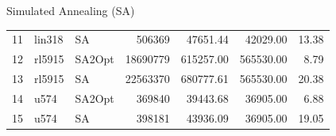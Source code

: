 \documentclass{beamer}
\begin{document}
\begin{frame}{Simulated Annealing (SA)}
\begin{table}[H]
\begin{tabular}{lllrrrr}
            11 & lin318   & SA        & 506369     & 47651.44       & 42029.00         & 13.38 \\
            12 & rl5915   & SA2Opt    & 18690779   & 615257.00      & 565530.00        & 8.79  \\
            13 & rl5915   & SA        & 22563370   & 680777.61      & 565530.00        & 20.38 \\
            14 & u574     & SA2Opt    & 369840     & 39443.68       & 36905.00         & 6.88  \\
            15 & u574     & SA        & 398181     & 43936.09       & 36905.00         & 19.05 \\
            \bottomrule
        \end{tabular}
    \end{table}
\end{frame}
\end{document}
